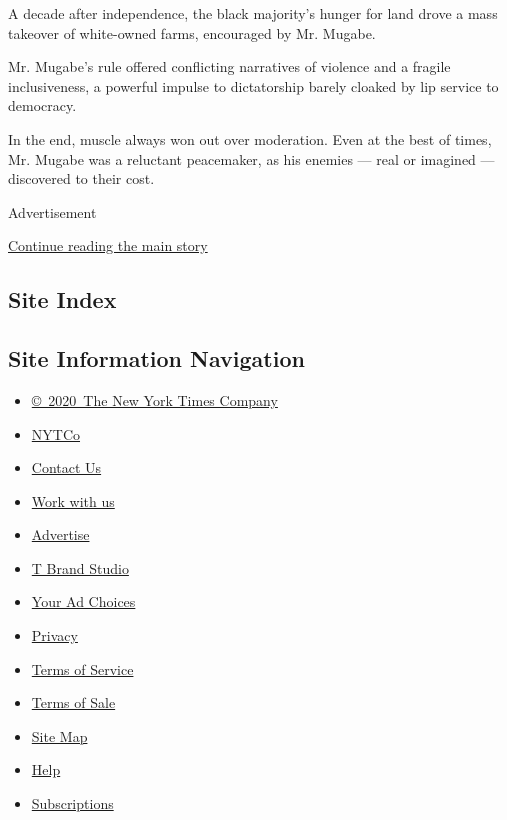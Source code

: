 A decade after independence, the black majority's hunger for land drove
a mass takeover of white-owned farms, encouraged by Mr. Mugabe.

Mr. Mugabe's rule offered conflicting narratives of violence and a
fragile inclusiveness, a powerful impulse to dictatorship barely cloaked
by lip service to democracy.

In the end, muscle always won out over moderation. Even at the best of
times, Mr. Mugabe was a reluctant peacemaker, as his enemies --- real or
imagined --- discovered to their cost.

Advertisement

\protect\hyperlink{after-bottom}{Continue reading the main story}

\hypertarget{site-index}{%
\subsection{Site Index}\label{site-index}}

\hypertarget{site-information-navigation}{%
\subsection{Site Information
Navigation}\label{site-information-navigation}}

\begin{itemize}
\tightlist
\item
  \href{https://help.nytimes.com/hc/en-us/articles/115014792127-Copyright-notice}{©~2020~The
  New York Times Company}
\end{itemize}

\begin{itemize}
\tightlist
\item
  \href{https://www.nytco.com/}{NYTCo}
\item
  \href{https://help.nytimes.com/hc/en-us/articles/115015385887-Contact-Us}{Contact
  Us}
\item
  \href{https://www.nytco.com/careers/}{Work with us}
\item
  \href{https://nytmediakit.com/}{Advertise}
\item
  \href{http://www.tbrandstudio.com/}{T Brand Studio}
\item
  \href{https://www.nytimes.com/privacy/cookie-policy\#how-do-i-manage-trackers}{Your
  Ad Choices}
\item
  \href{https://www.nytimes.com/privacy}{Privacy}
\item
  \href{https://help.nytimes.com/hc/en-us/articles/115014893428-Terms-of-service}{Terms
  of Service}
\item
  \href{https://help.nytimes.com/hc/en-us/articles/115014893968-Terms-of-sale}{Terms
  of Sale}
\item
  \href{https://spiderbites.nytimes.com}{Site Map}
\item
  \href{https://help.nytimes.com/hc/en-us}{Help}
\item
  \href{https://www.nytimes.com/subscription?campaignId=37WXW}{Subscriptions}
\end{itemize}
